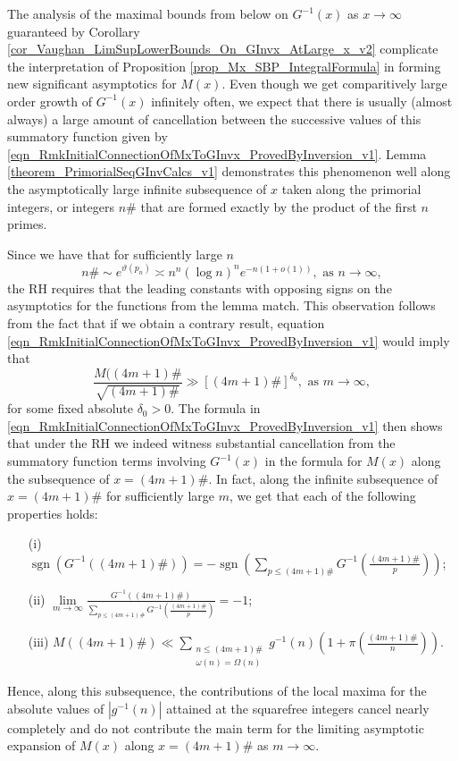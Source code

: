 \documentclass[11pt,reqno,a4letter]{article}
\numberwithin{figure}{section}
\numberwithin{table}{section}
\theoremstyle{plain}
\numberwithin{theorem}{section}
\theoremstyle{definition}
\begin{document}
The analysis of the maximal bounds from below on $G^{-1}(x)$ as 
$x \rightarrow \infty$ guaranteed by 
Corollary \ref{cor_Vaughan_LimSupLowerBounds_On_GInvx_AtLarge_x_v2} 
complicate the interpretation of 
Proposition \ref{prop_Mx_SBP_IntegralFormula} 
in forming new significant asymptotics for $M(x)$. 
Even though we get comparitively large order growth of 
$G^{-1}(x)$ infinitely often, 
we expect that there is usually (almost always) 
a large amount of cancellation between the successive 
values of this summatory function given by 
\eqref{eqn_RmkInitialConnectionOfMxToGInvx_ProvedByInversion_v1}. 
Lemma \ref{theorem_PrimorialSeqGInvCalcs_v1} 
demonstrates this phenomenon well along the asymptotically large infinite 
subsequence of $x$ taken along the primorial integers, or integers $n\#$ 
that are formed exactly by the product of the first $n$ primes. 

Since we have that for sufficiently large $n$ 
\cite{DUSART-1999,DUSART-2010} 
\[
n\# \sim e^{\vartheta(p_n)} \asymp n^n (\log n)^n e^{-n(1+o(1))}, 
     \text{ as } n \rightarrow \infty, 
\]
the RH requires that the leading constants with opposing signs 
on the asymptotics for the functions from the lemma match. 
This observation follows from the fact that if we obtain a contrary result, 
equation \eqref{eqn_RmkInitialConnectionOfMxToGInvx_ProvedByInversion_v1} would imply that 
\[
\frac{M((4m+1)\#}{\sqrt{(4m+1)\#}} \gg \left[(4m+1)\#\right]^{\delta_0}, 
     \text{ as } m \rightarrow \infty, 
\]
for some fixed absolute $\delta_0 > 0$. 
The formula in \eqref{eqn_RmkInitialConnectionOfMxToGInvx_ProvedByInversion_v1} 
then shows that under the RH we indeed witness substantial cancellation from the 
summatory function terms involving $G^{-1}(x)$ in the formula for $M(x)$ 
along the subsequence of $x = (4m+1)\#$. 
In fact, along the infinite subsequence of $x = (4m+1)\#$ for sufficiently large $m$, 
we get that each of the following properties holds: 
\begin{itemize} 
\item[(i)] $\operatorname{sgn}\left(G^{-1}((4m+1)\#)\right) = - \operatorname{sgn}\left( 
     \sum\limits_{p \leq (4m+1)\#} G^{-1}\left(\frac{(4m+1)\#}{p}\right)\right)$; 
\item[(ii)] $\lim\limits_{m \rightarrow \infty} \frac{G^{-1}((4m+1)\#)}{ 
     \sum\limits_{p \leq (4m+1)\#} G^{-1}\left(\frac{(4m+1)\#}{p}\right)} = -1$; 
\item[(iii)] $M((4m+1)\#) \ll \sum\limits_{\substack{n \leq (4m+1)\# \\ \omega(n)=\Omega(n)}} 
     g^{-1}(n) \left(1+\pi\left(\frac{(4m+1)\#}{n}\right)\right)$. 
\end{itemize} 
Hence, along this subsequence, the contributions of the 
local maxima for the absolute values of 
$|g^{-1}(n)|$ attained at the squarefree integers cancel nearly completely and do not 
contribute the main term for the limiting asymptotic expansion of $M(x)$ along 
$x = (4m+1)\#$ as $m \rightarrow \infty$. 
\end{document}
